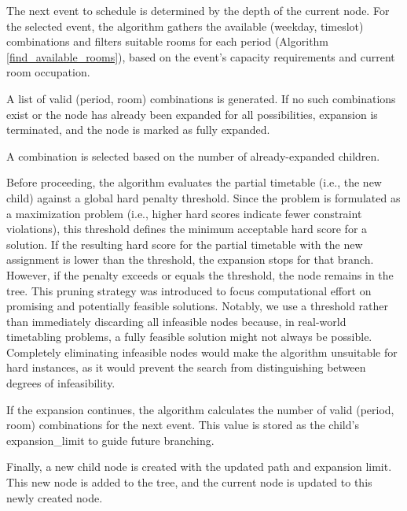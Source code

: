 The next event to schedule is determined by the depth of the current node. For the selected event, the algorithm gathers the available (weekday, timeslot) combinations and filters suitable rooms for each period (Algorithm \ref{find_available_rooms}), based on the event’s capacity requirements and current room occupation.

A list of valid (period, room) combinations is generated. If no such combinations exist or the node has already been expanded for all possibilities, expansion is terminated, and the node is marked as fully expanded.  

A combination is selected based on the number of already-expanded children. %

Before proceeding, the algorithm evaluates the partial timetable (i.e., the new child) against a global hard penalty threshold. Since the problem is formulated as a maximization problem (i.e., higher hard scores indicate fewer constraint violations), this threshold defines the minimum acceptable hard score for a solution. If the resulting hard score for the partial timetable with the new assignment is lower than the threshold, the expansion stops for that branch. However, if the penalty exceeds or equals the threshold, the node remains in the tree. This pruning strategy was introduced to focus computational effort on promising and potentially feasible solutions. Notably, we use a threshold rather than immediately discarding all infeasible nodes because, in real-world timetabling problems, a fully feasible solution might not always be possible. Completely eliminating infeasible nodes would make the algorithm unsuitable for hard instances, as it would prevent the search from distinguishing between degrees of infeasibility.

If the expansion continues, the algorithm calculates the number of valid (period, room) combinations for the next event. This value is stored as the child’s expansion\_limit to guide future branching.

Finally, a new child node is created with the updated path and expansion limit. This new node is added to the tree, and the current node is updated to this newly created node.

